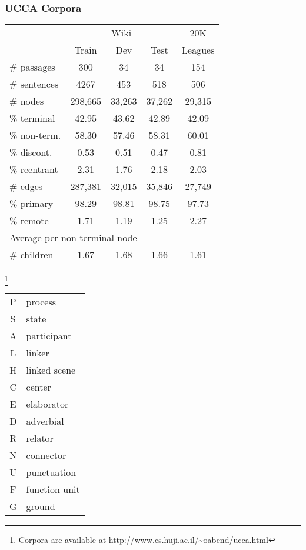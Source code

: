 \documentclass[t]{beamer}
\begin{document}
\begin{frame}
\frametitle{UCCA Corpora}
\begin{minipage}{.6\linewidth}
	\begin{tabular}{l|ccc|c}
	& \multicolumn{3}{c|}{Wiki} & 20K \\
	& \small Train & \small Dev & \small Test & Leagues \\
	\hline
	\# passages & 300 & 34 & 34 & 154 \\
	\# sentences & 4267 & 453 & 518 & 506 \\
	\hline
	\# nodes & 298,665 & 33,263 & 37,262 & 29,315 \\
	\% terminal & 42.95 & 43.62 & 42.89 & 42.09 \\
	\% non-term. & 58.30 & 57.46 & 58.31 & 60.01 \\
	\% discont. & 0.53 & 0.51 & 0.47 & 0.81 \\
	\% reentrant & 2.31 & 1.76 & 2.18 & 2.03 \\
	\hline
	\# edges & 287,381 & 32,015 & 35,846 & 27,749 \\
	\% primary & 98.29 & 98.81 & 98.75 & 97.73 \\
	\% remote & 1.71 & 1.19 & 1.25 & 2.27 \\
	\hline
	\multicolumn{3}{l}{\footnotesize Average per non-terminal node} \\
	\# children & 1.67 & 1.68 & 1.66 & 1.61 
	\end{tabular}\footnote{
	Corpora are available at \url{http://www.cs.huji.ac.il/~oabend/ucca.html}}
\end{minipage}
\begin{minipage}{.3\linewidth}
  \begin{adjustbox}{margin=2mm,frame}
  \begin{tabular}{cl}
	  P & process \\
	  S & state \\
	  A & participant \\
	  L & linker \\
	  H & linked scene \\
	  C & center \\
	  E & elaborator \\
	  D & adverbial \\
	  R & relator \\
	  N & connector \\
	  U & punctuation \\
	  F & function unit \\
	  G & ground
  \end{tabular}
  \end{adjustbox}
\end{minipage}
\end{frame}
\end{document}
